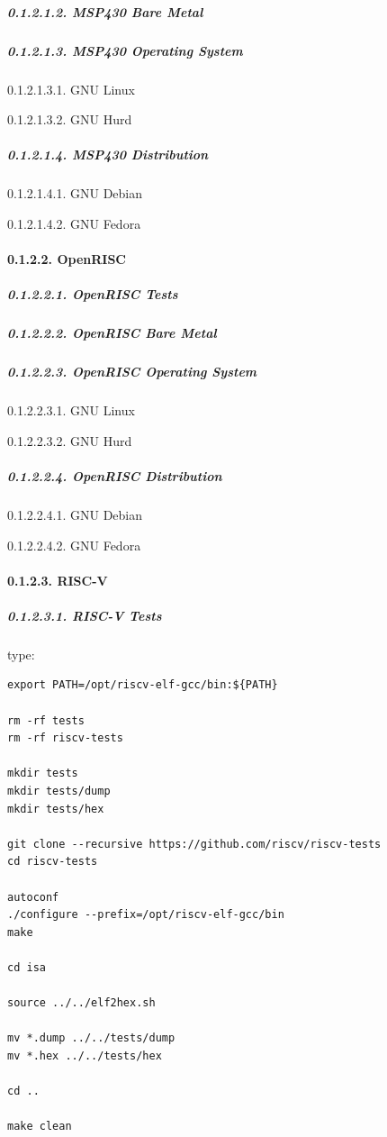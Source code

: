 \documentclass[
]{article}
\begin{document}
\hypertarget{msp430-bare-metal-1}{%
\subparagraph{0.1.2.1.2. MSP430 Bare Metal}\label{msp430-bare-metal-1}}

\hypertarget{msp430-operating-system-1}{%
\subparagraph{0.1.2.1.3. MSP430 Operating
System}\label{msp430-operating-system-1}}

0.1.2.1.3.1. GNU Linux

0.1.2.1.3.2. GNU Hurd

\hypertarget{msp430-distribution-1}{%
\subparagraph{0.1.2.1.4. MSP430
Distribution}\label{msp430-distribution-1}}

0.1.2.1.4.1. GNU Debian

0.1.2.1.4.2. GNU Fedora

\hypertarget{openrisc-3}{%
\paragraph{0.1.2.2. OpenRISC}\label{openrisc-3}}

\hypertarget{openrisc-tests-1}{%
\subparagraph{0.1.2.2.1. OpenRISC Tests}\label{openrisc-tests-1}}

\hypertarget{openrisc-bare-metal-1}{%
\subparagraph{0.1.2.2.2. OpenRISC Bare
Metal}\label{openrisc-bare-metal-1}}

\hypertarget{openrisc-operating-system-1}{%
\subparagraph{0.1.2.2.3. OpenRISC Operating
System}\label{openrisc-operating-system-1}}

0.1.2.2.3.1. GNU Linux

0.1.2.2.3.2. GNU Hurd

\hypertarget{openrisc-distribution-1}{%
\subparagraph{0.1.2.2.4. OpenRISC
Distribution}\label{openrisc-distribution-1}}

0.1.2.2.4.1. GNU Debian

0.1.2.2.4.2. GNU Fedora

\hypertarget{risc-v-3}{%
\paragraph{0.1.2.3. RISC-V}\label{risc-v-3}}

\hypertarget{risc-v-tests-1}{%
\subparagraph{0.1.2.3.1. RISC-V Tests}\label{risc-v-tests-1}}

type:

\begin{verbatim}
export PATH=/opt/riscv-elf-gcc/bin:${PATH}

rm -rf tests
rm -rf riscv-tests

mkdir tests
mkdir tests/dump
mkdir tests/hex

git clone --recursive https://github.com/riscv/riscv-tests
cd riscv-tests

autoconf
./configure --prefix=/opt/riscv-elf-gcc/bin
make

cd isa

source ../../elf2hex.sh

mv *.dump ../../tests/dump
mv *.hex ../../tests/hex

cd ..

make clean
\end{verbatim}
\end{document}

